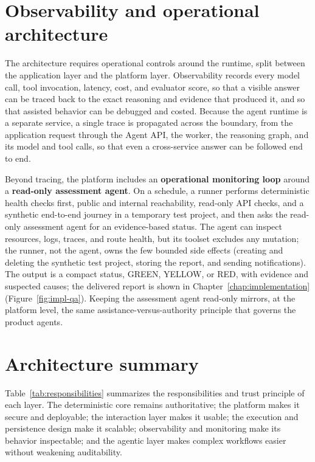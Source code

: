 \section{Observability and operational architecture}
\label{sec:observability}

The architecture requires operational controls around the runtime, split between
the application layer and the platform layer. Observability records every model
call, tool invocation, latency, cost, and evaluator score, so that a visible answer
can be traced back to the exact reasoning and evidence that produced it, and so
that assisted behavior can be debugged and costed. Because the agent runtime is a
separate service, a single trace is propagated across the boundary, from the
application request through the Agent API, the worker, the reasoning graph, and its
model and tool calls, so that even a cross-service answer can be followed end to
end.

Beyond tracing, the platform includes an \textbf{operational monitoring loop}
around a \textbf{read-only assessment agent}. On a schedule, a runner performs
deterministic health checks first, public and internal reachability, read-only API
checks, and a synthetic end-to-end journey in a temporary test project, and then
asks the read-only assessment agent for an evidence-based status. The agent can
inspect resources, logs, traces, and route health, but its toolset excludes any
mutation; the runner, not the agent, owns the few bounded side effects (creating
and deleting the synthetic test project, storing the report, and sending
notifications). The output is a compact status, GREEN, YELLOW, or RED, with
evidence and suspected causes; the delivered report is shown in
Chapter~\ref{chap:implementation} (Figure~\ref{fig:impl-qa}). Keeping the
assessment agent read-only mirrors, at
the platform level, the same assistance-versus-authority principle that governs the
product agents.

\section{Architecture summary}
\label{sec:arch-summary}

Table~\ref{tab:responsibilities} summarizes the responsibilities and trust
principle of each layer. The deterministic core remains authoritative; the platform
makes it secure and deployable; the interaction layer makes it usable; the execution
and persistence design make it scalable; observability and monitoring make its
behavior inspectable; and the agentic layer makes complex workflows easier without
weakening auditability.

